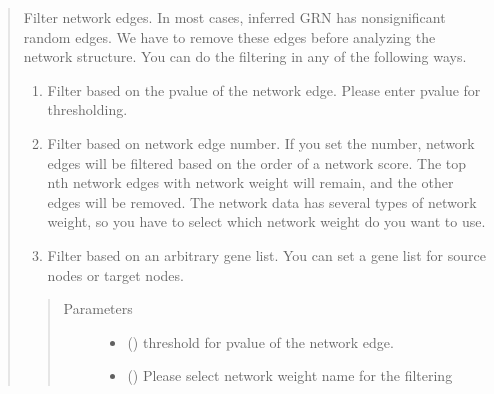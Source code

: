 \documentclass[letterpaper,10pt,english]{sphinxmanual}
\begin{document}
\begin{quote}
\begin{fulllineitems}
\begin{fulllineitems}
\label{\detokenize{modules/celloracle.network_analysis:celloracle.network_analysis.Links.filter_links}}
Filter network edges.
In most cases, inferred GRN has non\sphinxhyphen{}significant random edges.
We have to remove these edges before analyzing the network structure.
You can do the filtering in any of the following ways.
\begin{enumerate}
%
\item {} 
Filter based on the p\sphinxhyphen{}value of the network edge.
Please enter p\sphinxhyphen{}value for thresholding.

\item {} 
Filter based on network edge number.
If you set the number, network edges will be filtered based on the order of a network score. The top n\sphinxhyphen{}th network edges with network weight will remain, and the other edges will be removed.
The network data has several types of network weight, so you have to select which network weight do you want to use.

\item {} 
Filter based on an arbitrary gene list. You can set a gene list for source nodes or target nodes.

\end{enumerate}
\begin{quote}\begin{description}
\item[{Parameters}] \leavevmode\begin{itemize}
\item {} 
 () \textendash{} threshold for p\sphinxhyphen{}value of the network edge.

\item {} 
 () \textendash{} Please select network weight name for the filtering


\end{itemize}
\end{description}
\end{quote}
\end{fulllineitems}
\end{fulllineitems}
\end{quote}
\end{document}
